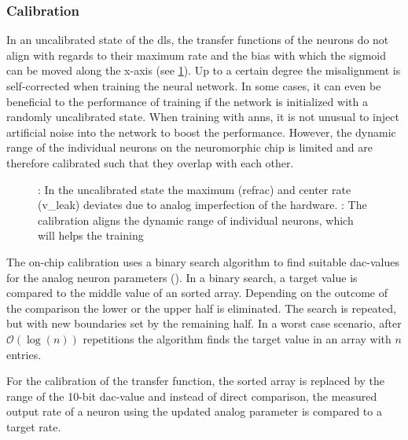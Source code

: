 \subsubsection*{Calibration}\label{calibration}
In an uncalibrated state of the \gls{dls}, the transfer functions of the neurons do not align with regards to their maximum rate and the bias with which the sigmoid can be moved along the x-axis (see \cref{transferfunction_wout_calib}). Up to a certain degree the misalignment is self-corrected when training the neural network. In some cases, it can even be beneficial to the performance of training if the network is initialized with a randomly uncalibrated state. When training with \glspl{ann}, it is not unusual to inject artificial noise into the network to boost the performance. However, the dynamic range of the individual neurons on the neuromorphic chip is limited and are therefore calibrated such that they overlap with each other.

\begin{figure}
	\centering
	\begin{subfigure}[b]{0.47\textwidth}
		\caption{}
		
		\label{transferfunction_wout_calib}
	\end{subfigure}
	\begin{subfigure}[b]{0.47\textwidth}		
		\caption{}
		
		\label{transferfunction_w_calib}
	\end{subfigure}
	\caption{: In the uncalibrated state the maximum (\gls{refrac}) and center rate (\gls{v_leak}) deviates due to analog imperfection of the hardware. : The calibration aligns the dynamic range of individual neurons, which will helps the training}
\end{figure}

The on-chip calibration uses a binary search algorithm to find suitable \gls{dac}-values for the analog neuron parameters (\citealp{binarysearchsource}). In a binary search, a target value is compared to the middle value of an sorted array. Depending on the outcome of the comparison the lower or the upper half is eliminated. The search is repeated, but with new boundaries set by the remaining half. In a worst case scenario, after $\mathcal{O}(\log(n))$ repetitions the algorithm finds the target value in an array with $n$ entries.

For the calibration of the transfer function, the sorted array is replaced by the range of the 10-bit \gls{dac}-value and instead of direct comparison, the measured output rate of a neuron using the updated analog parameter is compared to a target rate.

